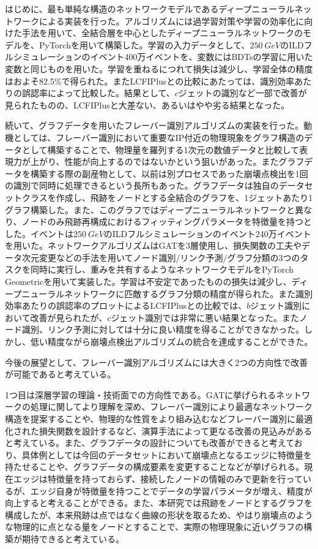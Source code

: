 はじめに、最も単純な構造のネットワークモデルであるディープニューラルネットワークによる実装を行った。アルゴリズムには過学習対策や学習の効率化に向けた手法を用いて、全結合層を中心としたディープニューラルネットワークのモデルを、PyTorchを用いて構築した。学習の入力データとして、$\SI{250}{GeV}$のILDフルシミュレーションのイベント400万イベントを、変数にはBDTsの学習に用いた変数と同じものを用いた。学習を重ねるにつれて損失は減少し、学習全体の精度はおよそ82.5\%で得られた。またLCFIPlusとの比較にあたっては、識別効率あたりの誤認率によって比較した。結果として、$c$ジェットの識別など一部で改善が見られたものの、LCFIPlusと大差ない、あるいはやや劣る結果となった。

続いて、グラフデータを用いたフレーバー識別アルゴリズムの実装を行った。動機としては、フレーバー識別において重要なIP付近の物理現象をグラフ構造のデータとして構築することで、物理量を羅列する1次元の数値データと比較して表現力が上がり、性能が向上するのではないかという狙いがあった。またグラフデータを構築する際の副産物として、以前は別プロセスであった崩壊点検出を1回の識別で同時に処理できるという長所もあった。グラフデータは独自のデータセットクラスを作成し、飛跡をノードとする全結合のグラフを、1ジェットあたり1グラフ構築した。また、このグラフではディープニューラルネットワークと異なり、ノードのみ飛跡再構成におけるフィッティングパラメータを特徴量を持つとした。イベントは$\SI{250}{GeV}$のILDフルシミュレーションのイベント240万イベントを用いた。ネットワークアルゴリズムはGATを3層使用し、損失関数の工夫やデータ次元変更などの手法を用いてノード識別/リンク予測/グラフ分類の3つのタスクを同時に実行し、重みを共有するようなネットワークモデルをPyTorch Geometricを用いて実装した。学習は不安定であったものの損失は減少し、ディープニューラルネットワークに匹敵するグラフ分類の精度が得られた。また識別効率あたりの誤認率のプロットによるLCFIPlusとの比較では、$b$ジェット識別において改善が見られたが、$c$ジェット識別では非常に悪い結果となった。またノード識別、リンク予測に対しては十分に良い精度を得ることができなかった。しかし、低い精度ながら崩壊点検出アルゴリズムの統合を達成することができた。

今後の展望として、フレーバー識別アルゴリズムには大きく2つの方向性で改善が可能であると考えている。

1つ目は深層学習の理論・技術面での方向性である。GATに挙げられるネットワークの処理に関してより理解を深め、フレーバー識別により最適なネットワーク構造を提案することや、物理的な性質をより組み込むなどフレーバー識別に最適化された損失関数を設計するなど、演算手法によって更なる改善の見込みがあると考えている。また、グラフデータの設計についても改善ができると考えており、具体例としては今回のデータセットにおいて崩壊点となるエッジに特徴量を持たせることや、グラフデータの構成要素を変更することなどが挙げられる。現在エッジは特徴量を持っておらず、接続したノードの情報のみで更新を行っているが、エッジ自身が特徴量を持つことでデータの学習パラメータが増え、精度が向上すると考えることができる。また、本研究では飛跡をノードとするグラフを構成したが、本来飛跡は点ではなく曲線の形状を取るため、やはり崩壊点のような物理的に点となる量をノードとすることで、実際の物理現象に近いグラフの構築が期待できると考えている。

